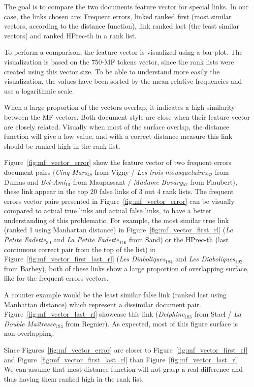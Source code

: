 The goal is to compare the two documents feature vector for special links.
In our case, the links chosen are: Frequent errors, linked ranked first (most similar vectors, according to the distance function), link ranked last (the least similar vectors) and ranked HPrec-th in a rank list.

To perform a comparison, the feature vector is visualized using a bar plot.
The visualization is based on the $750$-MF tokens vector, since the rank lists were created using this vector size.
To be able to understand more easily the visualization, the values have been sorted by the mean relative frequencies and use a logarithmic scale.

When a large proportion of the vectors overlap, it indicates a high similarity between the MF vectors.
Both document style are close when their feature vector are closely related.
Visually when most of the surface overlap, the distance function will give a low value, and with a correct distance measure this link should be ranked high in the rank list.

Figure~\ref{fig:mf_vector_error} show the feature vector of two frequent errors document pairs (\textit{Cinq-Mars}$_{48}$ from Vigny / \textit{Les trois mousquetaires}$_{62}$ from Dumas and \textit{Bel-Ami}$_{10}$ from Maupassant / \textit{Madame Bovary}$_{52}$ from Flaubert), these link appear in the top 20 false links of 3 out 4 rank lists.
The frequent errors vector pairs presented in Figure~\ref{fig:mf_vector_error} can be visually compared to actual true links and actual false links, to have a better understanding of this problematic.
For example, the most similar true link (ranked 1 using Manhattan distance) in Figure~\ref{fig:mf_vector_first_rl} (\textit{La Petite Fadette}$_{30}$ and \textit{La Petite Fadette}$_{116}$ from Sand) or the HPrec-th (last continuous correct pair from the top of the list) in Figure~\ref{fig:mf_vector_first_last_rl} (\textit{Les Diaboliques}$_{184}$ and \textit{Les Diaboliques}$_{192}$ from Barbey), both of these links show a large proportion of overlapping surface, like for the frequent errors vectors.

A counter example would be the least similar false link (ranked last using Manhattan distance) which represent a dissimilar document pair.
Figure~\ref{fig:mf_vector_last_rl} showcase this link (\textit{Delphine}$_{183}$ from Stael / \textit{La Double Maîtresse}$_{194}$ from Regnier).
As expected, most of this figure surface is non-overlapping.

Since Figures~\ref{fig:mf_vector_error} are closer to Figure~\ref{fig:mf_vector_first_rl} and Figure~\ref{fig:mf_vector_first_last_rl} than Figure~\ref{fig:mf_vector_last_rl}.
We can assume that most distance function will not grasp a real difference and thus having them ranked high in the rank list.

